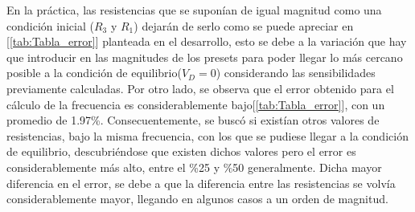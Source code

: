 En la práctica, las resistencias que se suponían de igual magnitud como una condición inicial ($R_3$ y $R_1$) dejarán de serlo como se puede apreciar en [\ref{tab:Tabla_error}] planteada en el desarrollo, esto se debe a la variación que hay que introducir en las magnitudes de los presets para poder llegar lo más cercano posible a la condición de equilibrio($V_D=0$) considerando las sensibilidades previamente calculadas.
Por otro lado, se observa que el error obtenido para el cálculo de la frecuencia es  considerablemente bajo[\ref{tab:Tabla_error}], con un promedio de 1.97\%. Consecuentemente, se buscó si existían otros valores de resistencias, bajo la misma frecuencia, con los que se pudiese llegar a la condición de equilibrio, descubriéndose que existen dichos valores pero el error es considerablemente más alto, entre el \%25 y \%50 generalmente. Dicha mayor diferencia en el error, se debe a que la diferencia entre las resistencias se volvía considerablemente mayor, llegando en algunos casos a un orden de magnitud. 

